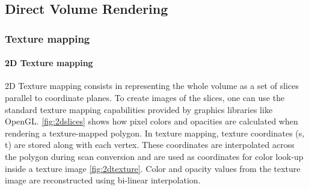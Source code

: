 \subsection{Direct Volume Rendering}

\subsubsection{Texture mapping}

\paragraph{2D Texture mapping}
2D Texture mapping consists in representing the whole volume as a set of slices parallel to coordinate planes. To create images of the slices, one can use the standard texture mapping capabilities provided by graphics libraries like OpenGL. \ref{fig:2dslices} shows how pixel colors and opacities are calculated when rendering a texture-mapped polygon. In texture mapping, texture coordinates (s, t) are stored along with each vertex. These coordinates are interpolated across the polygon during scan conversion and are used as coordinates for color look-up inside a texture image \ref{fig:2dtexture}. Color and opacity values from the texture image are reconstructed using bi-linear interpolation.


